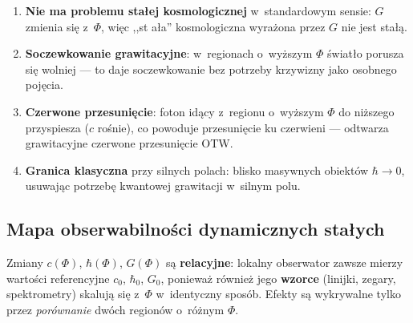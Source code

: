 \begin{enumerate}[nosep]
  \item \textbf{Nie ma problemu sta\l{}ej kosmologicznej}
        w~standardowym sensie: $G$ zmienia si\k{e} z~$\Phi$,
        wi\k{e}c ,,st a\l{}a'' kosmologiczna wyra\.zona przez $G$
        nie jest sta\l{}\k{a}.
  \item \textbf{Soczewkowanie grawitacyjne}: w~regionach
        o~wy\.zszym $\Phi$ \'swiat\l{}o porusza si\k{e} wolniej ---
        to daje soczewkowanie bez potrzeby krzywizny
        jako osobnego poj\k{e}cia.
  \item \textbf{Czerwone przesuni\k{e}cie}: foton id\k{a}cy
        z~regionu o~wy\.zszym $\Phi$ do ni\.zszego przyspiesza
        ($c$ ro\'snie), co powoduje przesuni\k{e}cie ku
        czerwieni --- odtwarza grawitacyjne czerwone
        przesuni\k{e}cie OTW.
  \item \textbf{Granica klasyczna} przy silnych polach:
        blisko masywnych obiekt\'ow $\hbar \to 0$, usuwaj\k{a}c
        potrzeb\k{e} kwantowej grawitacji w~silnym polu.
\end{enumerate}

\subsection{Mapa obserwabilno\'sci dynamicznych sta\l{}ych}%
\label{ssec:obserwabilnosc-stalych}

Zmiany $c(\Phi)$, $\hbar(\Phi)$, $G(\Phi)$ s\k{a} \textbf{relacyjne}:
lokalny obserwator zawsze mierzy warto\'sci referencyjne $c_0$, $\hbar_0$,
$G_0$, poniewa\.z r\'ownie\.z jego \textbf{wzorce} (linijki, zegary,
spektrometry) skaluj\k{a} si\k{e} z~$\Phi$ w~identyczny spos\'ob.
Efekty s\k{a} wykrywalne tylko przez \emph{por\'ownanie} dw\'och
region\'ow o~r\'o\.znym $\Phi$.

